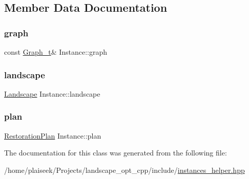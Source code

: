 \subsection{Member Data Documentation}
\mbox{\label{class_instance_a7b76d85eaacaec2480ceed2218108013}} 
\subsubsection{\texorpdfstring{graph}{graph}}
{\footnotesize\ttfamily const \hyperlink{pl__reff_8cpp_a65aea14f39d53b24df9910d54216d620}{Graph\+\_\+t}\& Instance\+::graph}

\mbox{\label{class_instance_a5a255c00cd67699f9aed6a3402f94560}} 
\subsubsection{\texorpdfstring{landscape}{landscape}}
{\footnotesize\ttfamily \hyperlink{class_landscape}{Landscape} Instance\+::landscape}

\mbox{\label{class_instance_a95435f6fe84c71114f4e47160854d621}} 
\subsubsection{\texorpdfstring{plan}{plan}}
{\footnotesize\ttfamily \hyperlink{class_restoration_plan}{Restoration\+Plan} Instance\+::plan}



The documentation for this class was generated from the following file\+:\begin{DoxyCompactItemize}
\item 
/home/plaiseek/\+Projects/landscape\+\_\+opt\+\_\+cpp/include/\hyperlink{instances__helper_8hpp}{instances\+\_\+helper.\+hpp}\end{DoxyCompactItemize}
